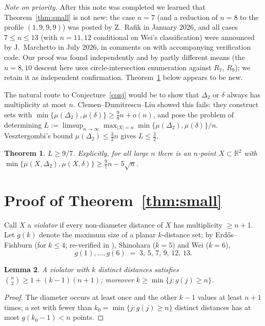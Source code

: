 \documentclass[11pt]{amsart}
\newtheorem{theorem}{Theorem}
\newtheorem{lemma}[theorem]{Lemma}
\newcommand{\R}{\mathbb{R}}
\newcommand{\md}{\mu}
\begin{document}
\emph{Note on priority.} After this note was completed we learned that
Theorem~\ref{thm:small} is not new: the case $n=7$ (and a reduction of $n=8$ to the
profile $(1,9,9,9)$) was posted by Z.~Rafik in January 2026, and all cases
$7\le n\le 13$ (with $n=11,12$ conditional on Wei's classification) were announced by
J.~Marchetto in July 2026, in comments on \cite{Blo132} with accompanying
verification code. Our proof was found independently and by partly different means
(the $n=8,10$ descent here uses circle-intersection enumeration against $R_7$, $R_9$);
we retain it as independent confirmation. Theorem~\ref{thm:97} below appears to be new.

The natural route to Conjecture~\ref{conj} would be to show that $\Delta_2$ or
$\delta$ always has multiplicity at most $n$. Clemen--Dumitrescu--Liu showed this
fails: they construct sets with
$\min\{\md(\Delta_2),\md(\delta)\}\ge\tfrac98n+o(n)$, and pose the problem
\cite[Problem~1.6]{CDL} of determining
$L:=\limsup_{n\to\infty}\max_{|X|=n}\min\{\md(\Delta_2),\md(\delta)\}/n$.
Vesztergombi's bound $\md(\Delta_2)\le\tfrac32n$ \cite{Ve87} gives $L\le\tfrac32$.

\begin{theorem}\label{thm:97}
$L\ge 9/7$. Explicitly, for all large $n$ there is an $n$-point $X\subset\R^2$ with
$\min\{\md(X,\Delta_2),\md(X,\delta)\}\ge\tfrac97n-5\sqrt n$.
\end{theorem}

\section{Proof of Theorem~\ref{thm:small}}
Call $X$ a \emph{violator} if every non-diameter distance of $X$ has multiplicity
$\ge n+1$. Let $g(k)$ denote the maximum size of a planar $k$-distance set; by
Erd\H{o}s--Fishburn \cite{EF96} (for $k\le4$; re-verified in \cite{BMP,Lat19}),
Shinohara \cite{Shi08} ($k=5$) and Wei \cite{Wei12} ($k=6$),
\[ g(1),\dots,g(6) \;=\; 3,\,5,\,7,\,9,\,12,\,13 .\]

\begin{lemma}\label{lem:count}
A violator with $k$ distinct distances satisfies
$\binom n2\ge 1+(k-1)(n+1)$; moreover $k\ge\min\{j:g(j)\ge n\}$.
\end{lemma}
\begin{proof}
The diameter occurs at least once and the other $k-1$ values at least $n+1$ times;
a set with fewer than $k_0=\min\{j:g(j)\ge n\}$ distinct distances has at most
$g(k_0-1)<n$ points.
\end{proof}
\end{document}

